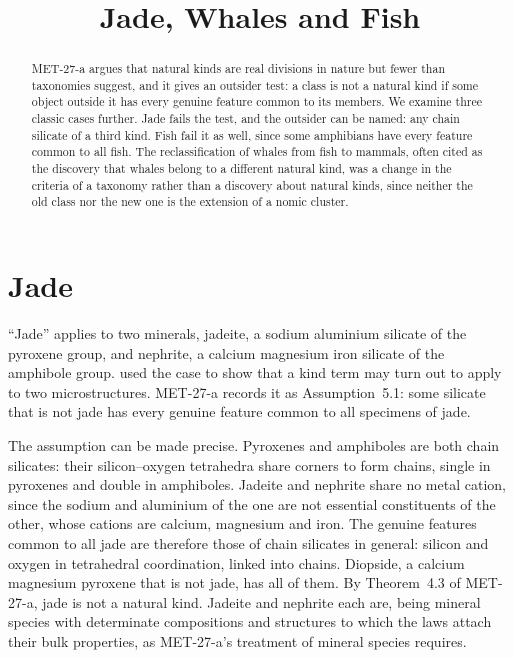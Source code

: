 \documentclass{situationist-preprint}
\title{Jade, Whales and Fish}
\begin{document}
\maketitle

\begin{abstract}
MET-27-a argues that natural kinds are real divisions in nature but fewer than taxonomies suggest, and it gives an outsider test: a class is not a natural kind if some object outside it has every genuine feature common to its members. We examine three classic cases further. Jade fails the test, and the outsider can be named: any chain silicate of a third kind. Fish fail it as well, since some amphibians have every feature common to all fish. The reclassification of whales from fish to mammals, often cited as the discovery that whales belong to a different natural kind, was a change in the criteria of a taxonomy rather than a discovery about natural kinds, since neither the old class nor the new one is the extension of a nomic cluster.
\end{abstract}

\section{Jade}

\enquote{Jade} applies to two minerals, jadeite, a sodium aluminium silicate of the pyroxene group, and nephrite, a calcium magnesium iron silicate of the amphibole group. \citet{Putnam1975} used the case to show that a kind term may turn out to apply to two microstructures. MET-27-a records it as Assumption~5.1: some silicate that is not jade has every genuine feature common to all specimens of jade.

The assumption can be made precise. Pyroxenes and amphiboles are both chain silicates: their silicon--oxygen tetrahedra share corners to form chains, single in pyroxenes and double in amphiboles. Jadeite and nephrite share no metal cation, since the sodium and aluminium of the one are not essential constituents of the other, whose cations are calcium, magnesium and iron. The genuine features common to all jade are therefore those of chain silicates in general: silicon and oxygen in tetrahedral coordination, linked into chains. Diopside, a calcium magnesium pyroxene that is not jade, has all of them. By Theorem~4.3 of MET-27-a, jade is not a natural kind. Jadeite and nephrite each are, being mineral species with determinate compositions and structures to which the laws attach their bulk properties, as MET-27-a's treatment of mineral species requires.
\end{document}
